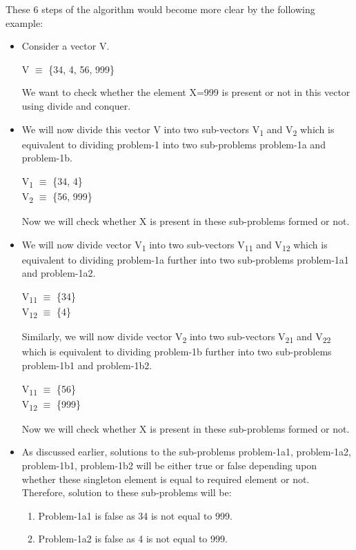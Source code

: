 \documentclass[conference]{IEEEtran}
\begin{document}
These 6 steps of the algorithm would become more clear by the following example:
\begin{itemize}
\item Consider a vector V.
\begin{center}
    V $\equiv$ \{34, 4, 56, 999\}
\end{center}
We want to check whether the element X=999 is present or not in this vector using divide and conquer.
\item We will now divide this vector V into two sub-vectors V\textsubscript{1} and V\textsubscript{2} which is equivalent to dividing problem-1 into two sub-problems problem-1a and problem-1b.
\begin{center}
    V\textsubscript{1} $\equiv$ \{34, 4\}\\
    V\textsubscript{2} $\equiv$ \{56, 999\}
\end{center}
Now we will check whether X is present in these sub-problems formed or not.
\item We will now divide vector V\textsubscript{1} into two sub-vectors V\textsubscript{11} and V\textsubscript{12} which is equivalent to dividing problem-1a further into two sub-problems problem-1a1 and problem-1a2.
\begin{center}
    V\textsubscript{11} $\equiv$ \{34\}\\
    V\textsubscript{12} $\equiv$ \{4\}
\end{center}
Similarly, we will now divide vector V\textsubscript{2} into two sub-vectors V\textsubscript{21} and V\textsubscript{22} which is equivalent to dividing problem-1b further into two sub-problems problem-1b1 and problem-1b2.
\begin{center}
    V\textsubscript{11} $\equiv$ \{56\}\\
    V\textsubscript{12} $\equiv$ \{999\}
\end{center}
Now we will check whether X is present in these sub-problems formed or not.
\item As discussed earlier, solutions to the sub-problems problem-1a1, problem-1a2, problem-1b1, problem-1b2 will be either true or false depending upon whether these singleton element is equal to required element or not.\\ Therefore, solution to these sub-problems will be:
\begin{enumerate}
    \setlength{\itemindent}{1em}
    \item Problem-1a1 is false as 34 is not equal to 999.
    \item Problem-1a2 is false as 4 is not equal to 999.

\end{enumerate}
\end{itemize}
\end{document}
